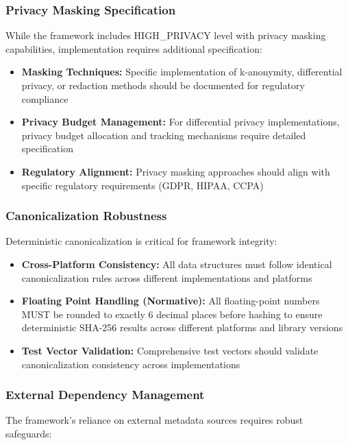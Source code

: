 \documentclass[12pt,a4paper]{article}
\begin{document}
\subsubsection{Privacy Masking Specification}

While the framework includes HIGH\_PRIVACY level with privacy masking capabilities, implementation requires additional specification:

\begin{itemize}
\item \textbf{Masking Techniques:} Specific implementation of k-anonymity, differential privacy, or redaction methods should be documented for regulatory compliance
\item \textbf{Privacy Budget Management:} For differential privacy implementations, privacy budget allocation and tracking mechanisms require detailed specification
\item \textbf{Regulatory Alignment:} Privacy masking approaches should align with specific regulatory requirements (GDPR, HIPAA, CCPA)
\end{itemize}

\subsubsection{Canonicalization Robustness}

Deterministic canonicalization is critical for framework integrity:

\begin{itemize}
\item \textbf{Cross-Platform Consistency:} All data structures must follow identical canonicalization rules across different implementations and platforms
\item \textbf{Floating Point Handling (Normative):} All floating-point numbers MUST be rounded to exactly 6 decimal places before hashing to ensure deterministic SHA-256 results across different platforms and library versions
\item \textbf{Test Vector Validation:} Comprehensive test vectors should validate canonicalization consistency across implementations
\end{itemize}

\subsubsection{External Dependency Management}

The framework's reliance on external metadata sources requires robust safeguards:
\end{document}

